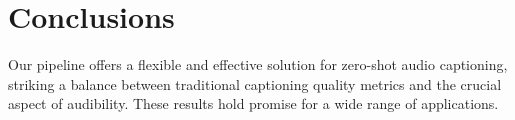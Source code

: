 \documentclass{article}
\begin{document}
\section{Conclusions}
Our pipeline offers a flexible and effective solution for zero-shot audio captioning, striking a balance between traditional captioning quality metrics and the crucial aspect of audibility. These results hold promise for a wide range of applications.



\end{document}
